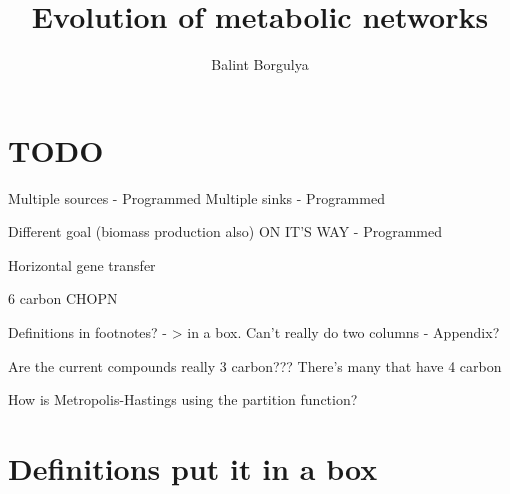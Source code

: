 \documentclass[10pt,a4paper]{article}
\title{Evolution of metabolic networks}
\author{Balint Borgulya}
\begin{document}
	
	
	
	\maketitle
	
	\begin{abstract}
		
	\end{abstract}
	
	\section*{TODO}
	\label{sec:todo}
	
	Multiple sources - Programmed
	Multiple sinks - Programmed

	Different goal (biomass production also) ON IT'S WAY - Programmed

	Horizontal gene transfer


	6 carbon CHOPN

	Definitions in footnotes? - > in a box. Can't really do two columns - Appendix?

	Are the current compounds really 3 carbon??? There's many that have 4 carbon

	How is Metropolis-Hastings using the partition function?

	\section*{Definitions put it in a box}
	
\end{document}
